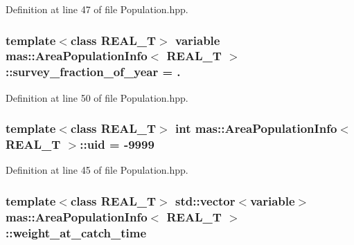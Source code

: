 Definition at line 47 of file Population.\-hpp.

\hypertarget{structmas_1_1_area_population_info_a770e532e8ac9f51d0fb6c43dd16a250a}{
\subsubsection[{survey\-\_\-fraction\-\_\-of\-\_\-year}]{\setlength{\rightskip}{0pt plus 5cm}template$<$class R\-E\-A\-L\-\_\-\-T$>$ {\bf variable} {\bf mas\-::\-Area\-Population\-Info}$<$ R\-E\-A\-L\-\_\-\-T $>$\-::survey\-\_\-fraction\-\_\-of\-\_\-year = .}}\label{structmas_1_1_area_population_info_a770e532e8ac9f51d0fb6c43dd16a250a}


Definition at line 50 of file Population.\-hpp.

\hypertarget{structmas_1_1_area_population_info_a718466a245393c1fb6b8ebd03ef346ee}{
\subsubsection[{uid}]{\setlength{\rightskip}{0pt plus 5cm}template$<$class R\-E\-A\-L\-\_\-\-T$>$ int {\bf mas\-::\-Area\-Population\-Info}$<$ R\-E\-A\-L\-\_\-\-T $>$\-::uid = -\/9999}}\label{structmas_1_1_area_population_info_a718466a245393c1fb6b8ebd03ef346ee}


Definition at line 45 of file Population.\-hpp.

\hypertarget{structmas_1_1_area_population_info_a9111e0b85aba10c24a77ced73c9726af}{
\subsubsection[{weight\-\_\-at\-\_\-catch\-\_\-time}]{\setlength{\rightskip}{0pt plus 5cm}template$<$class R\-E\-A\-L\-\_\-\-T$>$ std\-::vector$<${\bf variable}$>$ {\bf mas\-::\-Area\-Population\-Info}$<$ R\-E\-A\-L\-\_\-\-T $>$\-::weight\-\_\-at\-\_\-catch\-\_\-time}}\label{structmas_1_1_area_population_info_a9111e0b85aba10c24a77ced73c9726af}


